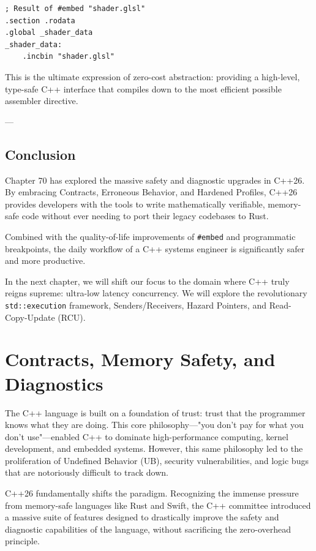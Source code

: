 {{{{{{\begin{lstlisting}[language={[x86masm]Assembler}]
; Result of #embed "shader.glsl"
.section .rodata
.global _shader_data
_shader_data:
    .incbin "shader.glsl"
\end{lstlisting}

This is the ultimate expression of zero-cost abstraction: providing a high-level, type-safe C++ interface that compiles down to the most efficient possible assembler directive.

---

\section{Conclusion}

Chapter 70 has explored the massive safety and diagnostic upgrades in C++26. By embracing Contracts, Erroneous Behavior, and Hardened Profiles, C++26 provides developers with the tools to write mathematically verifiable, memory-safe code without ever needing to port their legacy codebases to Rust.

Combined with the quality-of-life improvements of \texttt{#embed} and programmatic breakpoints, the daily workflow of a C++ systems engineer is significantly safer and more productive.

In the next chapter, we will shift our focus to the domain where C++ truly reigns supreme: ultra-low latency concurrency. We will explore the revolutionary \texttt{std::execution} framework, Senders/Receivers, Hazard Pointers, and Read-Copy-Update (RCU).
\chapter{Contracts, Memory Safety, and Diagnostics}

The C++ language is built on a foundation of trust: trust that the programmer knows what they are doing. This core philosophy—"you don't pay for what you don't use"—enabled C++ to dominate high-performance computing, kernel development, and embedded systems. However, this same philosophy led to the proliferation of Undefined Behavior (UB), security vulnerabilities, and logic bugs that are notoriously difficult to track down.

C++26 fundamentally shifts the paradigm. Recognizing the immense pressure from memory-safe languages like Rust and Swift, the C++ committee introduced a massive suite of features designed to drastically improve the safety and diagnostic capabilities of the language, without sacrificing the zero-overhead principle.

}}}}}}
